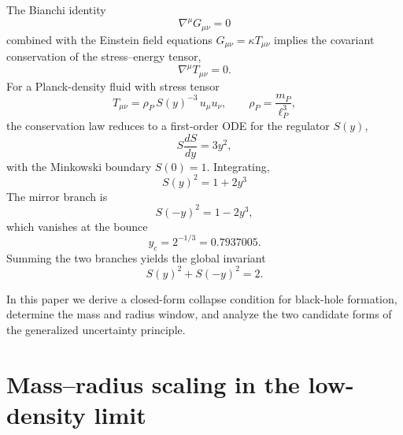 \documentclass[a4paper,7pt,oneside,openany]{book}
\begin{document}
The Bianchi identity
\begin{equation}
\nabla^{\mu}G_{\mu\nu}=0
\label{eq:bianchi}
\end{equation}
combined with the Einstein field equations $G_{\mu\nu}=\kappa 
T_{\mu\nu}$ implies the covariant conservation of the 
stress--energy tensor,
\begin{equation}
\nabla^{\mu}T_{\mu\nu}=0.
\label{eq:conservation}
\end{equation}
For a Planck-density fluid with stress tensor
\begin{equation}
T_{\mu\nu}=\rho_{P}\,S(y)^{-3}\,u_{\mu}u_{\nu},
\qquad
\rho_{P}=\frac{m_{P}}{\ell_{P}^{3}},
\label{eq:stress}
\end{equation}
the conservation law reduces to a first-order ODE for the 
regulator $S(y)$,
\begin{equation}
S\frac{dS}{dy}=3y^{2},
\label{eq:ODE}
\end{equation}
with the Minkowski boundary $S(0)=1$. Integrating,
\begin{equation}
\boxed{\;S(y)^{2}=1+2y^{3}\;}
\label{eq:S2}
\end{equation}
The mirror branch is
\begin{equation}
S(-y)^{2}=1-2y^{3},
\label{eq:Smirror}
\end{equation}
which vanishes at the bounce
\begin{equation}
y_{c}=2^{-1/3}=0.7937005.
\label{eq:yc}
\end{equation}
Summing the two branches yields the global invariant
\begin{equation}
\boxed{\;S(y)^{2}+S(-y)^{2}=2.\;}
\label{eq:invariant}
\end{equation}

In this paper we derive a closed-form collapse condition for 
black-hole formation, determine the mass and radius window, and 
analyze the two candidate forms of the generalized uncertainty 
principle.

\section{Mass--radius scaling in the low-density limit}
\end{document}
